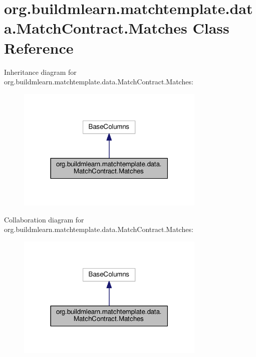 \hypertarget{classorg_1_1buildmlearn_1_1matchtemplate_1_1data_1_1MatchContract_1_1Matches}{}\section{org.\+buildmlearn.\+matchtemplate.\+data.\+Match\+Contract.\+Matches Class Reference}
\label{classorg_1_1buildmlearn_1_1matchtemplate_1_1data_1_1MatchContract_1_1Matches}


Inheritance diagram for org.\+buildmlearn.\+matchtemplate.\+data.\+Match\+Contract.\+Matches\+:
\nopagebreak
\begin{figure}[H]
\begin{center}
\leavevmode
\includegraphics[width=255pt]{classorg_1_1buildmlearn_1_1matchtemplate_1_1data_1_1MatchContract_1_1Matches__inherit__graph}
\end{center}
\end{figure}


Collaboration diagram for org.\+buildmlearn.\+matchtemplate.\+data.\+Match\+Contract.\+Matches\+:
\nopagebreak
\begin{figure}[H]
\begin{center}
\leavevmode
\includegraphics[width=255pt]{classorg_1_1buildmlearn_1_1matchtemplate_1_1data_1_1MatchContract_1_1Matches__coll__graph}
\end{center}
\end{figure}
